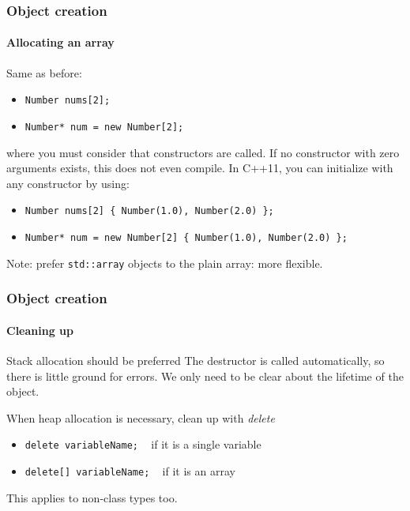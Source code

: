 \begin{frame}
\frametitle{Object creation}
\framesubtitle{Allocating an array}

\begin{block}{Same as before:}
\begin{itemize}
\item \texttt{Number nums[2]; }
\item \texttt{Number* num = new Number[2]; }
\end{itemize}
where you must consider that constructors are called. If no constructor with zero arguments exists, this does not even compile. In C++11, you can initialize with
any constructor by using:
\begin{itemize}
\item \texttt{Number nums[2] \{ Number(1.0), Number(2.0) \}; }
\item \texttt{Number* num = new Number[2] \{ Number(1.0), Number(2.0) \}; }
\end{itemize}
Note: prefer \texttt{std::array} objects to the plain array: more flexible.
\end{block}

\end{frame}

\begin{frame}
\frametitle{Object creation}
\framesubtitle{Cleaning up}

\begin{block}{Stack allocation should be preferred}
The destructor is called automatically, so there is little ground for errors. We only need to be clear about the lifetime of the object.
\end{block}
\pause
\begin{block}{When heap allocation is necessary, clean up with {\em delete}}
\begin{itemize}
\item \texttt{delete variableName;} \,\,\, if it is a single variable
\item \texttt{delete[] variableName;} \,\,\, if it is an array
\end{itemize}
This applies to non-class types too.
\end{block}
\end{frame}
